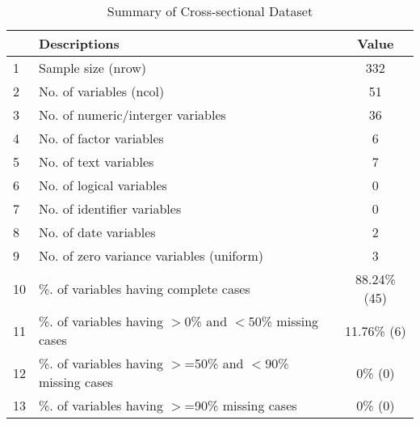 \begin{table}[ht]
\centering
\caption{Summary of Cross-sectional Dataset} 
\begin{tabular}{llc}
  \hline
 & Descriptions & Value \\ 
  \hline
1 & Sample size (nrow) & 332 \\ 
  2 & No. of variables (ncol) & 51 \\ 
  3 & No. of numeric/interger variables & 36 \\ 
  4 & No. of factor variables & 6 \\ 
  5 & No. of text variables & 7 \\ 
  6 & No. of logical variables & 0 \\ 
  7 & No. of identifier variables & 0 \\ 
  8 & No. of date variables & 2 \\ 
  9 & No. of zero variance variables (uniform) & 3 \\ 
  10 & \%. of variables having complete cases & 88.24\% (45) \\ 
  11 & \%. of variables having $>$0\% and $<$50\% missing cases & 11.76\% (6) \\ 
  12 & \%. of variables having $>$=50\% and $<$90\% missing cases & 0\% (0) \\ 
  13 & \%. of variables having $>$=90\% missing cases & 0\% (0) \\ 
   \hline
\end{tabular}
\end{table}
